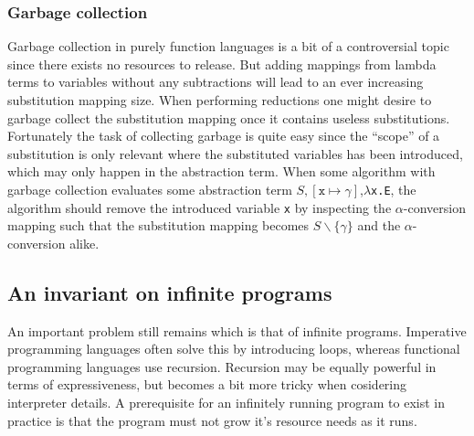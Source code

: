 \documentclass[11pt,oneside,a4paper]{report}
\begin{document}
\subsubsection{Garbage collection}
Garbage collection in purely function languages is a bit of a controversial topic since there exists no resources to release.
But adding mappings from lambda terms to variables without any subtractions will lead to an ever increasing substitution mapping size.
When performing reductions one might desire to garbage collect the substitution mapping once it contains useless substitutions.
Fortunately the task of collecting garbage is quite easy since the ``scope'' of a substitution is only relevant where the substituted variables has been introduced, which may only happen in the abstraction term.
When some algorithm with garbage collection evaluates some abstraction term $S,[\texttt{x} \mapsto \gamma]$,\texttt{$\lambda$x.E}, the algorithm should remove the introduced variable \texttt{x} by inspecting the $\alpha$-conversion mapping such that the substitution mapping becomes $S\backslash \{ \gamma \}$ and the $\alpha$-conversion alike.

\subsection{An invariant on infinite programs}
An important problem still remains which is that of infinite programs.
Imperative programming languages often solve this by introducing loops, whereas functional programming languages use recursion.
Recursion may be equally powerful in terms of expressiveness, but becomes a bit more tricky when cosidering interpreter details.
A prerequisite for an infinitely running program to exist in practice is that the program must not grow it's resource needs as it runs.
\end{document}
